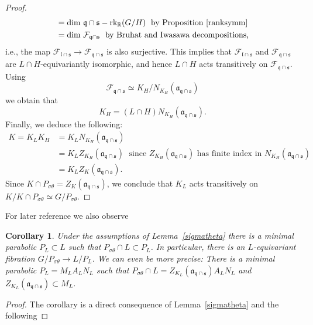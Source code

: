 \documentclass[10]{amsart}
\newtheorem{cor}[thm]{Corollary}
\theoremstyle{remark}
\theoremstyle{definition}
\numberwithin{equation}{section}
\newcommand{\gt}{\theta}
\newcommand{\beu}{\begin{equation*}}
\begin{document}
{\begin{proof}
\begin{align*}
&=\text{dim }{\mathfrak q}\cap{\mathfrak s}-\text{rk}_{\mathbb R}(G/H)\;\text{ by Proposition \ref{ranksymm}}\\
&=\text{dim }{\mathcal F}_{{\mathfrak q}\cap{\mathfrak s}}\;\text{ by Bruhat and Iwasawa decompositions,}
\end{align*}
%
i.e., the map ${\mathcal F}_{{\mathfrak l}\cap{\mathfrak s}}\rightarrow{\mathcal F}_{{\mathfrak q}\cap{\mathfrak s}}$ is also surjective. This implies that ${\mathcal F}_{{\mathfrak l}\cap{\mathfrak s}}$ and ${\mathcal F}_{{\mathfrak q}\cap{\mathfrak s}}$ are $L\cap H$-equivariantly isomorphic, and hence $L\cap H$ acts transitively on ${\mathcal F}_{{\mathfrak q}\cap{\mathfrak s}}$. Using
%
\beu
{\mathcal F}_{{\mathfrak q}\cap{\mathfrak s}}\simeq K_H/N_{K_H}({\mathfrak a}_{{\mathfrak q}\cap{\mathfrak s}})
\end{equation*}
%
we obtain that
%
\beu
K_H=(L\cap H)N_{K_H}({\mathfrak a}_{{\mathfrak q}\cap{\mathfrak s}}).
\end{equation*}
%
Finally, we deduce the following:
%
\begin{align*}
K=K_L K_H&=K_L N_{K_H}({\mathfrak a}_{{\mathfrak q}\cap{\mathfrak s}})\\
&=K_L Z_{K_H}({\mathfrak a}_{{\mathfrak q}\cap{\mathfrak s}})\;\text{ since $Z_{K_H}({\mathfrak a}_{{\mathfrak q}\cap{\mathfrak s}})$ has finite index in }N_{K_H}({\mathfrak a}_{{\mathfrak q}\cap{\mathfrak s}})\\
&=K_L Z_{K}({\mathfrak a}_{{\mathfrak q}\cap{\mathfrak s}}).
\end{align*}
%
Since $K\cap P_{\sigma\theta}=Z_{K}({\mathfrak a}_{{\mathfrak q}\cap{\mathfrak s}})$, we conclude that $K_L$ acts transitively on $K/K\cap P_{\sigma\theta}\simeq G/P_{\sigma\theta}$.
\end{proof}
For later reference we also observe
\begin{cor}\label{renoir}
Under the assumptions of Lemma~\ref{sigmatheta} there is a minimal parabolic $P_L\subset L$ such that $P_{\sigma\gt}\cap L\subset P_L$.  In particular, there is an $L$-equivariant fibration
$G/P_{\sigma\gt}\rightarrow L/P_L$. We can even be more precise: There is a minimal parabolic $P_L=M_LA_LN_L$ such that $P_{\sigma\gt}\cap L= Z_{K_L}({\mathfrak a}_{{\mathfrak q}\cap{\mathfrak s}})A_LN_L$ and $Z_{K_L}({\mathfrak a}_{{\mathfrak q}\cap{\mathfrak s}})\subset M_L$.
\end{cor}
\begin{proof} The corollary is a direct consequence of Lemma~\ref{sigmatheta} and the following


\end{proof}}
\end{document}
